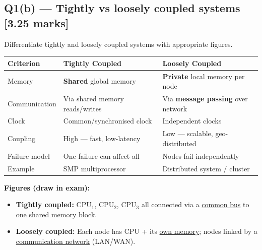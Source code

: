 \documentclass[12pt, a4paper]{article}
\newenvironment{qbox}{\begin{mdframed}[style=qframe]}{\end{mdframed}}
\newenvironment{solbox}{\begin{mdframed}[style=solframe]}{\end{mdframed}}
\newcommand{\qmarks}[1]{\hfill\textbf{\color{orange!70!black}[#1 marks]}}
\begin{document}
\subsection{Q1(b) — Tightly vs loosely coupled systems \texorpdfstring{\qmarks{3.25}}{}}
\begin{qbox}Differentiate tightly and loosely coupled systems with appropriate figures.\end{qbox}
\begin{solbox}
\begin{center}\renewcommand{\arraystretch}{1.3}
\begin{tabularx}{\linewidth}{l X X}
\toprule
\textbf{Criterion} & \textbf{Tightly Coupled} & \textbf{Loosely Coupled} \\
\midrule
Memory & \textbf{Shared} global memory & \textbf{Private} local memory per node \\
Communication & Via shared memory reads/writes & Via \textbf{message passing} over network \\
Clock & Common/synchronised clock & Independent clocks \\
Coupling & High — fast, low-latency & Low — scalable, geo-distributed \\
Failure model & One failure can affect all & Nodes fail independently \\
Example & SMP multiprocessor & Distributed system / cluster \\
\bottomrule
\end{tabularx}\end{center}

\textbf{Figures (draw in exam):}
\begin{itemize}[leftmargin=1.4cm, itemsep=2pt]
  \item \textbf{Tightly coupled:} CPU$_1$, CPU$_2$, CPU$_3$ all connected via a \underline{common bus} to \underline{one shared memory block}.
  \item \textbf{Loosely coupled:} Each node has CPU + its \underline{own memory}; nodes linked by a \underline{communication network} (LAN/WAN).
\end{itemize}
\end{solbox}

\end{document}
